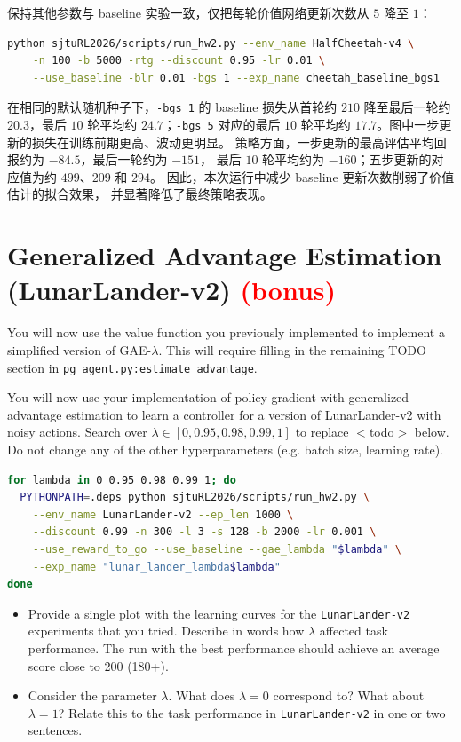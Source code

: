 \documentclass{article}
\begin{document}
保持其他参数与 baseline 实验一致，仅把每轮价值网络更新次数从 $5$ 降至 $1$：
\begin{lstlisting}[language=bash]
python sjtuRL2026/scripts/run_hw2.py --env_name HalfCheetah-v4 \
    -n 100 -b 5000 -rtg --discount 0.95 -lr 0.01 \
    --use_baseline -blr 0.01 -bgs 1 --exp_name cheetah_baseline_bgs1
\end{lstlisting}
在相同的默认随机种子下，\verb|-bgs 1| 的 baseline 损失从首轮约 $210$
降至最后一轮约 $20.3$，最后 $10$ 轮平均约 $24.7$；\verb|-bgs 5|
对应的最后 $10$ 轮平均约 $17.7$。图中一步更新的损失在训练前期更高、波动更明显。
策略方面，一步更新的最高评估平均回报约为 $-84.5$，最后一轮约为 $-151$，
最后 $10$ 轮平均约为 $-160$；五步更新的对应值为约 $499$、$209$ 和 $294$。
因此，本次运行中减少 baseline 更新次数削弱了价值估计的拟合效果，
并显著降低了最终策略表现。

\newpage\section{Generalized Advantage Estimation (LunarLander-v2) \textcolor{red}{(bonus)}}

You will now use the value function you previously implemented to implement a simplified version of GAE-$\lambda$. This will require filling in the remaining TODO section in \texttt{pg\_agent.py:estimate\_advantage}.

You will now use your implementation of policy gradient with generalized advantage estimation to learn a controller for a version of LunarLander-v2 with noisy actions. Search over $\lambda\in [0,0.95,0.98,0.99,1] $  to replace $<$todo$>$ below. Do not change any of the other hyperparameters (e.g. batch size, learning rate).

\begin{lstlisting}[language=bash]
for lambda in 0 0.95 0.98 0.99 1; do
  PYTHONPATH=.deps python sjtuRL2026/scripts/run_hw2.py \
    --env_name LunarLander-v2 --ep_len 1000 \
    --discount 0.99 -n 300 -l 3 -s 128 -b 2000 -lr 0.001 \
    --use_reward_to_go --use_baseline --gae_lambda "$lambda" \
    --exp_name "lunar_lander_lambda$lambda"
done
\end{lstlisting}

\begin{itemize}
    \item Provide a single plot with the learning curves for the \verb|LunarLander-v2| experiments that you tried. Describe in words how $\lambda$ affected task performance. The run with the best performance should achieve an average score close to 200 (180+).
    \item  Consider the parameter $\lambda$. What does $\lambda = 0$ correspond to? What about $\lambda = 1$? Relate this to the task performance in \verb|LunarLander-v2| in one or two sentences.
\end{itemize}
\end{document}

